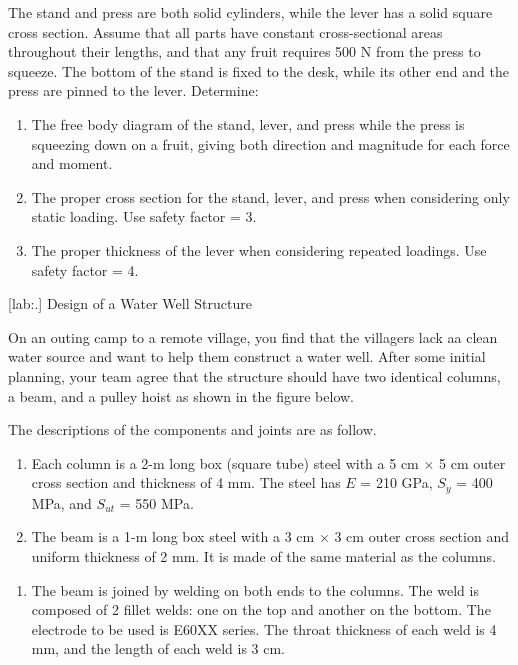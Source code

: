 \documentclass[a4paper,openany,nobib]{tufte-book}
\begin{document}
{{The stand and press are both solid cylinders, while the lever has a
solid square cross section. Assume that all parts have constant
cross-sectional areas throughout their lengths, and that any fruit
requires 500 N from the press to squeeze. The bottom of the stand is
fixed to the desk, while its other end and the press are pinned to the
lever. Determine:

\begin{enumerate}
\item The free body diagram of the stand, lever, and press while the press
is squeezing down on a fruit, giving both direction and magnitude for
each force and moment.

\item The proper cross section for the stand, lever, and press when
considering only static loading. Use safety factor = 3.

\item The proper thickness of the lever when considering repeated loadings.
Use safety factor = 4.
\end{enumerate}

[lab:.] Design of a Water Well
Structure

On an outing camp to a remote village, you find that the villagers lack
aa clean water source and want to help them construct a water well.
After some initial planning, your team agree that the structure should
have two identical columns, a beam, and a pulley hoist as shown in the
figure below.


The descriptions of the components and joints are as follow.

\begin{enumerate}
\item Each column is a 2-m long box (square tube) steel with a 5 cm
\(\times\) 5 cm outer cross section and thickness of 4 mm. The steel
has \(E\) = 210 GPa, \(S_y\) = 400 MPa, and \(S_{ut}\) = 550 MPa.

\item The beam is a 1-m long box steel with a 3 cm \(\times\) 3 cm outer
cross section and uniform thickness of 2 mm. It is made of the same
material as the columns.
\end{enumerate}


\hspace{1cm}
\begin{enumerate}
\item The beam is joined by welding on both ends to the columns. The weld
is composed of 2 fillet welds: one on the top and another on the
bottom. The electrode to be used is E60XX series. The throat
thickness of each weld is 4 mm, and the length of each weld is 3 cm.
\end{enumerate}


}}
\end{document}

